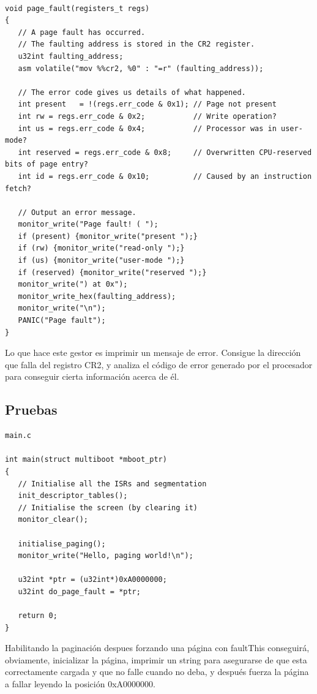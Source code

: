 \documentclass{report}
\begin{document}
\begin{lstlisting}

void page_fault(registers_t regs)
{
   // A page fault has occurred.
   // The faulting address is stored in the CR2 register.
   u32int faulting_address;
   asm volatile("mov %%cr2, %0" : "=r" (faulting_address));

   // The error code gives us details of what happened.
   int present   = !(regs.err_code & 0x1); // Page not present
   int rw = regs.err_code & 0x2;           // Write operation?
   int us = regs.err_code & 0x4;           // Processor was in user-mode?
   int reserved = regs.err_code & 0x8;     // Overwritten CPU-reserved bits of page entry?
   int id = regs.err_code & 0x10;          // Caused by an instruction fetch?

   // Output an error message.
   monitor_write("Page fault! ( ");
   if (present) {monitor_write("present ");}
   if (rw) {monitor_write("read-only ");}
   if (us) {monitor_write("user-mode ");}
   if (reserved) {monitor_write("reserved ");}
   monitor_write(") at 0x");
   monitor_write_hex(faulting_address);
   monitor_write("\n");
   PANIC("Page fault");
}
\end{lstlisting}

Lo que hace este gestor es imprimir un mensaje de error. Consigue la dirección que falla del registro CR2, y analiza el código de error generado por el procesador para conseguir cierta información acerca de él.

\subsection{Pruebas}


\begin{lstlisting}
main.c

int main(struct multiboot *mboot_ptr)
{
   // Initialise all the ISRs and segmentation
   init_descriptor_tables();
   // Initialise the screen (by clearing it)
   monitor_clear();

   initialise_paging();
   monitor_write("Hello, paging world!\n");

   u32int *ptr = (u32int*)0xA0000000;
   u32int do_page_fault = *ptr;

   return 0;
}
\end{lstlisting}

Habilitando la paginación despues forzando una página con faultThis conseguirá, obviamente, inicializar la página, imprimir un string para asegurarse de que esta correctamente cargada y que no falle cuando no deba, y después fuerza la página a fallar leyendo la posición 0xA0000000.
\end{document}
